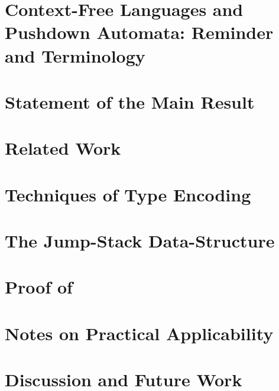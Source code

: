 \documentclass[a4paper,USenglish]{lipics}
\begin{document}
\section{Context-Free Languages and Pushdown Automata: Reminder and Terminology}
\label{Section:pushdown}


\section{Statement of the Main Result} 
\label{Section:result}


\section{Related Work}
\label{Section:related}


\section{Techniques of Type Encoding}
\label{Section:toolkit}


\section{The Jump-Stack Data-Structure}
\label{Section:jump}


\section{Proof of }
\label{Section:proof}


\section{Notes on Practical Applicability}
\label{Section:applicability}


\section{Discussion and Future Work}
\label{Section:zz}



\small

\end{document}
